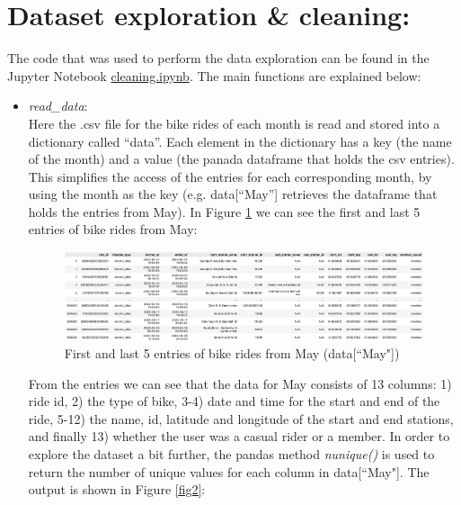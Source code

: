 \documentclass[12pt]{article}
\begin{document}
\section*{Dataset exploration \& cleaning:}
The code that was used to perform the data exploration can be found in the Jupyter Notebook \href{https://github.com/SummerKassem/BikeShareCS/blob/main/Code/cleaning.ipynb}{cleaning.ipynb}. The main functions are explained below:
\begin{itemize}
	\item \textit{read\_data}:\\
	Here the .csv file for the bike rides of each month is read and stored into a dictionary called “data”. Each element in the dictionary has a key (the name of the month) and a value (the panada dataframe that holds the csv entries). This simplifies the access of the entries for each corresponding month, by using the month as the key (e.g. data[“May”] retrieves the dataframe that holds the entries from May). In Figure \ref{fig1} we can see the first and last 5 entries of bike rides from May:

	\begin{figure}[h]
	\hspace{-1.8cm}
	\includegraphics[width=8 in, height = 2 in]{imgMay.png}
	\caption{First and last 5 entries of bike rides from May (data[``May"])}
	\label{fig1}
	\end{figure}
	\pagebreak
	
	From the entries we can see that the data for May consists of 13 columns: 1) ride id, 2) the type of bike, 3-4) date and time for the start and end of the ride, 5-12) the name, id, latitude and longitude of the start and end stations, and finally 13) whether the user was a casual rider or a member. In order to explore the dataset a bit further, the pandas method \textit{nunique()} is used to return the number of unique values for each column in data[``May"]. The output is shown in Figure \ref{fig2}:
	

\end{itemize}
\end{document}
